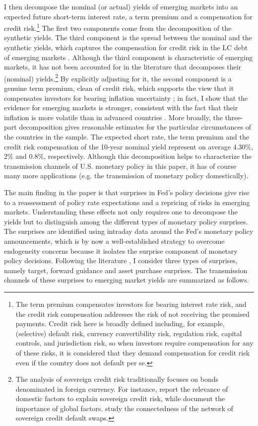 {I then decompose the nominal (or actual) yields of emerging markets into an expected future short-term interest rate, a term premium and a compensation for credit risk.\footnote{ The term premium compensates investors for bearing interest rate risk, and the credit risk compensation addresses the risk of not receiving the promised payments. Credit risk here is broadly defined including, for example, (selective) default risk, currency convertibility risk, regulation risk, capital controls, and jurisdiction risk, so when investors require compensation for any of these risks, it is considered that they demand compensation for credit risk even if the country does not default per se.} The first two components come from the decomposition of the synthetic yields. The third component is the spread between the nominal and the synthetic yields, which captures the compensation for credit risk in the LC debt of emerging markets \citep{DuSchreger:2016JoF}. Although the third component is characteristic of emerging markets, it has not been accounted for in the literature that decomposes their (nominal) yields.\footnote{ The analysis of sovereign credit risk traditionally focuses on bonds denominated in foreign currency. For instance, \cite{HilscherNosbusch:2010} report the relevance of domestic factors to explain sovereign credit risk, while \cite{Longstaffetal:2011} document the importance of global factors. \cite{BostanciYilmaz:2020} study the connectedness of the network of sovereign credit default swaps.} By explicitly adjusting for it, the second component is a genuine term premium, clean of credit risk, which supports the view that it compensates investors for bearing inflation uncertainty \citep{Wright:2011}; in fact, I show that the evidence for emerging markets is stronger, consistent with the fact that their inflation is more volatile than in advanced countries \citep{HaKoseOhnsorge:2019}. More broadly, the three-part decomposition gives reasonable estimates for the particular circumstances of the countries in the sample. The expected short rate, the term premium and the credit risk compensation of the 10-year nominal yield represent on average 4.30\%, 2\% and 0.8\%, respectively. Although this decomposition helps to characterize the transmission channels of U.S. monetary policy in this paper, it has of course many more applications (e.g. the transmission of monetary policy domestically). 

The main finding in the paper is that surprises in Fed's policy decisions give rise to a reassessment of policy rate expectations and a repricing of risks in emerging markets. Understanding these effects not only requires one to decompose the yields but to distinguish among the different types of monetary policy surprises. The surprises are identified using intraday data around the Fed's monetary policy announcements, which is by now a well-established strategy to overcome endogeneity concerns because it isolates the surprise component of monetary policy decisions. Following the literature \citep{GSS:2005a,Swanson:2018}, I consider three types of surprises, namely target, forward guidance and asset purchase surprises. The transmission channels of these surprises to emerging market yields are summarized as follows.

}

